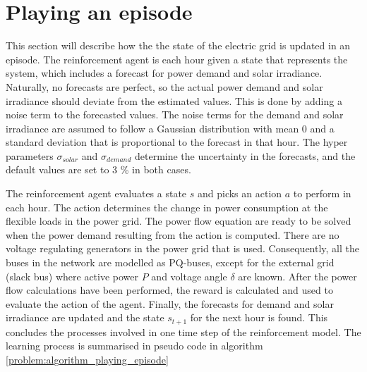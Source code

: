 \documentclass[class=book, crop=false]{standalone}
\begin{document}
\section{Playing an episode}
This section will describe how the the state of the electric grid is updated in an episode. The reinforcement agent is each hour given a state that represents the system, which includes a forecast for power demand and solar irradiance. Naturally, no forecasts are perfect, so the actual power demand and solar irradiance should deviate from the estimated values. This is done by adding a noise term to the forecasted values. The noise terms for the demand and solar irradiance are assumed to follow a Gaussian distribution with mean 0 and a standard deviation that is proportional to the forecast in that hour. The hyper parameters $\sigma_{solar}$ and $\sigma_{demand}$ determine the uncertainty in the forecasts, and the default values are set to 3 \% in both cases.



The reinforcement agent evaluates a state $s$ and picks an action $a$ to perform in each hour. The action determines the change in power consumption at the flexible loads in the power grid. The power flow equation are ready to be solved when the power demand resulting from the action is computed. There are no voltage regulating generators in the power grid that is used. Consequently, all the buses in the network are modelled as PQ-buses, except for the external grid (slack bus) where active power $P$ and voltage angle $\delta$ are known. After the power flow calculations have been performed, the reward is calculated and used to evaluate the action of the agent. Finally, the forecasts for demand and solar irradiance are updated and the state $s_{t+1}$ for the next hour is found. This concludes the processes involved in one time step of the reinforcement model. The learning process is summarised in pseudo code in algorithm \ref{problem:algorithm_playing_episode} 
\end{document}
